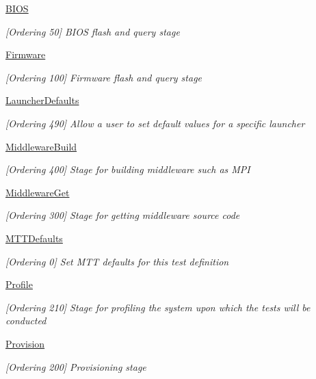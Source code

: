 \begin{DoxyCompactItemize}
\item 
\hyperlink{group__BIOS}{B\-I\-O\-S}
\begin{DoxyCompactList}\small\item\em \mbox{[}Ordering 50\mbox{]} B\-I\-O\-S flash and query stage \end{DoxyCompactList}\item 
\hyperlink{group__Firmware}{Firmware}
\begin{DoxyCompactList}\small\item\em \mbox{[}Ordering 100\mbox{]} Firmware flash and query stage \end{DoxyCompactList}\item 
\hyperlink{group__LauncherDefaults}{Launcher\-Defaults}
\begin{DoxyCompactList}\small\item\em \mbox{[}Ordering 490\mbox{]} Allow a user to set default values for a specific launcher \end{DoxyCompactList}\item 
\hyperlink{group__MiddlewareBuild}{Middleware\-Build}
\begin{DoxyCompactList}\small\item\em \mbox{[}Ordering 400\mbox{]} Stage for building middleware such as M\-P\-I \end{DoxyCompactList}\item 
\hyperlink{group__MiddlewareGet}{Middleware\-Get}
\begin{DoxyCompactList}\small\item\em \mbox{[}Ordering 300\mbox{]} Stage for getting middleware source code \end{DoxyCompactList}\item 
\hyperlink{group__MTTDefaults}{M\-T\-T\-Defaults}
\begin{DoxyCompactList}\small\item\em \mbox{[}Ordering 0\mbox{]} Set M\-T\-T defaults for this test definition \end{DoxyCompactList}\item 
\hyperlink{group__Profile}{Profile}
\begin{DoxyCompactList}\small\item\em \mbox{[}Ordering 210\mbox{]} Stage for profiling the system upon which the tests will be conducted \end{DoxyCompactList}\item 
\hyperlink{group__Provision}{Provision}
\begin{DoxyCompactList}\small\item\em \mbox{[}Ordering 200\mbox{]} Provisioning stage \end{DoxyCompactList}\item 

\end{DoxyCompactItemize}
